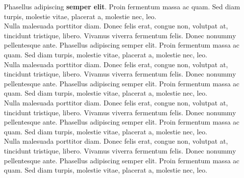 \documentclass[theme]{cv_einstein}
\begin{document}
\begin{paracol}{2}
\begin{rightcolumn}
{            Phasellus adipiscing \textbf{semper elit}. Proin fermentum massa ac quam. Sed diam turpis, molestie vitae, placerat a, molestie nec, leo.}
            \vspace{\itemspace}\\
            {Nulla malesuada porttitor diam. Donec felis erat, congue non, volutpat at, tincidunt tristique, libero. Vivamus viverra fermentum felis. Donec nonummy pellentesque ante. Phasellus adipiscing semper elit. Proin fermentum massa ac quam. Sed diam turpis, molestie vitae, placerat a, molestie nec, leo.}
            \vspace{\itemspace}\\
            {Nulla malesuada porttitor diam. Donec felis erat, congue non, volutpat at, tincidunt tristique, libero. Vivamus viverra fermentum felis. Donec nonummy pellentesque ante. Phasellus adipiscing semper elit. Proin fermentum massa ac quam. Sed diam turpis, molestie vitae, placerat a, molestie nec, leo.}
            \vspace{\itemspace}\\
            {Nulla malesuada porttitor diam. Donec felis erat, congue non, volutpat at, tincidunt tristique, libero. Vivamus viverra fermentum felis. Donec nonummy pellentesque ante. Phasellus adipiscing semper elit. Proin fermentum massa ac quam. Sed diam turpis, molestie vitae, placerat a, molestie nec, leo.}
            \vspace{\itemspace}\\
            {Nulla malesuada porttitor diam. Donec felis erat, congue non, volutpat at, tincidunt tristique, libero. Vivamus viverra fermentum felis. Donec nonummy pellentesque ante. Phasellus adipiscing semper elit. Proin fermentum massa ac quam. Sed diam turpis, molestie vitae, placerat a, molestie nec, leo.}
            \vspace{\itemspace}\\

\end{rightcolumn}
\end{paracol}
\end{document}
